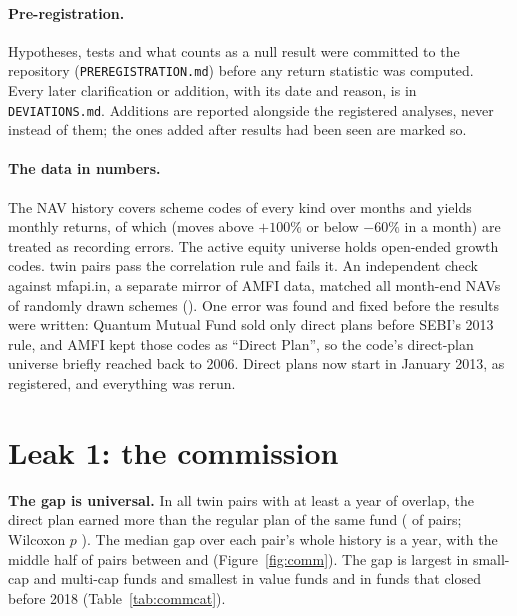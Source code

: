 \documentclass[11pt]{article}
\begin{document}
\paragraph{Pre-registration.} Hypotheses, tests and what counts as a null result were committed to the repository (\texttt{PREREGISTRATION.md}) before any return statistic was computed. Every later clarification or addition, with its date and reason, is in \texttt{DEVIATIONS.md}. Additions are reported alongside the registered analyses, never instead of them; the ones added after results had been seen are marked so.

\paragraph{The data in numbers.} The NAV history covers \DqSchemeCodesAll{} scheme codes of every kind over \DqNavMonths{} months and yields \DqReturnsTotal{} monthly returns, of which \DqReturnsFlaggedAsErrors{} (moves above $+100\%$ or below $-60\%$ in a month) are treated as recording errors. The active equity universe holds \DqOpenEquityGrowthCodes{} open-ended growth codes. \DqTwinsAccepted{} twin pairs pass the correlation rule and \DqTwinsRejectedLowCorr{} fails it. An independent check against mfapi.in, a separate mirror of AMFI data, matched all \ValidateNavsMatched{} month-end NAVs of \ValidateSchemes{} randomly drawn schemes (\ValidateMatchShare). One error was found and fixed before the results were written: Quantum Mutual Fund sold only direct plans before SEBI's 2013 rule, and AMFI kept those codes as ``Direct Plan'', so the code's direct-plan universe briefly reached back to 2006. Direct plans now start in January 2013, as registered, and everything was rerun.

\section{Leak 1: the commission}
\textbf{The gap is universal.} In all \CommissionPairs{} twin pairs with at least a year of overlap, the direct plan earned more than the regular plan of the same fund (\CommissionSharePositive{} of pairs; Wilcoxon $p$ \CommissionWilcoxonP). The median gap over each pair's whole history is \CommissionGapMedian{} a year, with the middle half of pairs between \CommissionGapPTwoFive{} and \CommissionGapPSevenFive{} (Figure~\ref{fig:comm}). The gap is largest in small-cap and multi-cap funds and smallest in value funds and in funds that closed before 2018 (Table~\ref{tab:commcat}).
\end{document}

